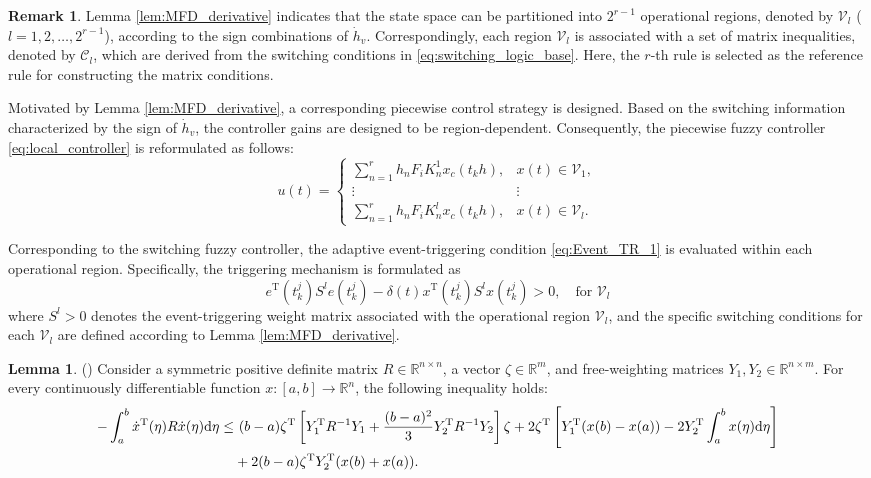 \documentclass[preprint,review,fleqn,sort&compress,3p]{elsarticle}
\theoremstyle{definition} %
\theoremstyle{definition}%
\newtheorem{Lem}{Lemma}[section]
\newtheorem{rem}{Remark}[section]
\begin{document}
\begin{rem} \label{rem:Vl_definition}
	Lemma \ref{lem:MFD_derivative} indicates that the state space can be partitioned into $2^{r-1}$ operational regions, denoted by $\mathcal{V}_l$ ($l = 1,2,\dots,2^{r-1}$), according to the sign combinations of $\dot{h}_v$. Correspondingly, each region $\mathcal{V}_l$ is associated with a set of matrix inequalities, denoted by $\mathcal{C}_l$, which are derived from the switching conditions in \eqref{eq:switching_logic_base}. Here, the $r$-th rule is selected as the reference rule for constructing the matrix conditions.
\end{rem}

Motivated by Lemma \ref{lem:MFD_derivative}, a corresponding piecewise control strategy is designed. Based on the switching information characterized by the sign of $\dot h_v$, the controller gains are designed to be region-dependent. Consequently, the piecewise fuzzy controller \eqref{eq:local_controller} is reformulated as follows:
\begin{equation} \label{eq:switching_controller}
	u(t) =
	\begin{cases}
		\sum_{n=1}^{r} h_n F_i K_{n}^1 x_c(t_k h), & x(t)\in \mathcal{V}_1, \\
		\vdots & \vdots \\
		\sum_{n=1}^{r} h_n F_i K_{n}^l x_c(t_k h), & x(t)\in \mathcal{V}_l.
	\end{cases}
\end{equation}

Corresponding to the switching fuzzy controller, the adaptive event-triggering condition \eqref{eq:Event_TR_1} is evaluated within each operational region. Specifically, the triggering mechanism is formulated as
\begin{equation} 
 e^{\mathrm{T}}(t^j_{k}) S^l e(t^j_{k}) - \delta(t) x^{\mathrm{T}}(t_{k}^j) S^l x(t_{k}^j) > 0, \quad \text{for } \mathcal{V}_l
\end{equation}
where $S^l>0$ denotes the event-triggering weight matrix associated with the operational region $\mathcal{V}_l$, and the specific switching conditions for each $\mathcal{V}_l$ are defined according to Lemma \ref{lem:MFD_derivative}.

\begin{Lem}\label{lem2}(\cite{guanModifiedLoopedFunctional2021a}) 
Consider a symmetric positive definite matrix $R \in \mathbb{R}^{n\times n}$, a vector $\zeta \in \mathbb{R}^{m}$, and free-weighting matrices $Y_1, Y_2 \in \mathbb{R}^{n\times m}$. For every continuously differentiable function $x : [a,b] \rightarrow \mathbb{R}^{n}$, the following inequality holds:
\begin{align}
	-\int_{a}^{b} \dot{x}^{\mathrm{T}}(\eta) R \dot{x}(\eta) \mathrm{d}\eta 
	\le & \ (b-a) \zeta^{\mathrm{T}} \left[ Y_1^{\mathrm{T}} R^{-1} Y_1 
	+ \frac{(b-a)^2}{3} Y_2^{\mathrm{T}} R^{-1} Y_2 \right] \zeta 
	 + 2\zeta^{\mathrm{T}} \left[ Y_1^{\mathrm{T}} (x(b) - x(a)) 
	 - 2Y_2^{\mathrm{T}} \int_{a}^{b} x(\eta)\mathrm{d}\eta \right] \notag \\
	& + 2(b-a) \zeta^{\mathrm{T}} Y_2^{\mathrm{T}} (x(b) + x(a)).
\end{align}
\end{Lem} 
\end{document}
